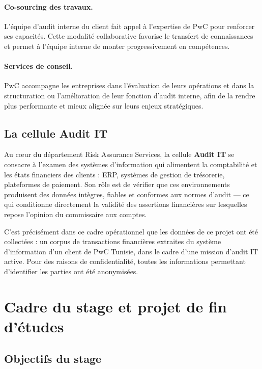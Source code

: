 \paragraph{Co-sourcing des travaux.}
L'équipe d'audit interne du client fait appel à l'expertise de PwC pour renforcer ses
capacités. Cette modalité collaborative favorise le transfert de connaissances et permet à
l'équipe interne de monter progressivement en compétences.

\paragraph{Services de conseil.}
PwC accompagne les entreprises dans l'évaluation de leurs opérations et dans la structuration
ou l'amélioration de leur fonction d'audit interne, afin de la rendre plus performante et
mieux alignée sur leurs enjeux stratégiques.

\subsection{La cellule Audit IT}

Au cœur du département Risk Assurance Services, la cellule \textbf{Audit IT} se consacre
à l'examen des systèmes d'information qui alimentent la comptabilité et les états financiers
des clients : ERP, systèmes de gestion de trésorerie, plateformes de paiement. Son rôle
est de vérifier que ces environnements produisent des données intègres, fiables et conformes
aux normes d'audit --- ce qui conditionne directement la validité des assertions financières
sur lesquelles repose l'opinion du commissaire aux comptes.

C'est précisément dans ce cadre opérationnel que les données de ce projet ont été collectées :
un corpus de transactions financières extraites du système d'information d'un client de PwC
Tunisie, dans le cadre d'une mission d'audit IT active. Pour des raisons de confidentialité,
toutes les informations permettant d'identifier les parties ont été anonymisées.

\section{Cadre du stage et projet de fin d'études}

\subsection{Objectifs du stage}

